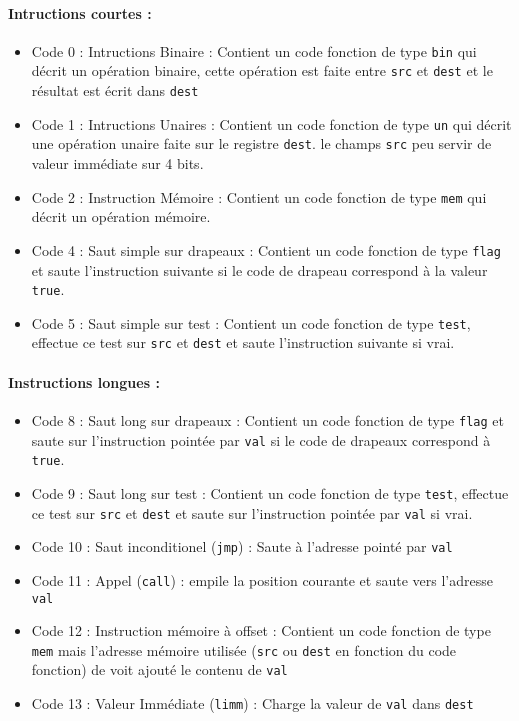 \documentclass[12pt]{article}
\begin{document}
\paragraph{Intructions courtes :}
\begin{itemize}
\item Code 0 : Intructions Binaire : Contient un code fonction de type
  \verb!bin! qui décrit un opération binaire, cette opération est faite entre
  \verb!src! et \verb!dest! et le résultat est écrit dans \verb!dest!
\item Code 1 : Intructions Unaires : Contient un code fonction de type \verb!un!
  qui décrit une opération unaire faite sur le registre \verb!dest!. le champs \verb!src!
  peu servir de valeur immédiate sur 4 bits.
\item Code 2 : Instruction Mémoire : Contient un code fonction de type
  \verb!mem! qui décrit un opération mémoire.
\item Code 4 : Saut simple sur drapeaux  : Contient un code fonction de type \verb!flag!
  et saute l'instruction suivante si le code de drapeau correspond à la valeur
  \verb!true!.
\item Code 5 : Saut simple sur test : Contient un code fonction de type
  \verb!test!, effectue ce test sur \verb!src! et \verb!dest! et saute
  l'instruction suivante si vrai.
\end{itemize}

\paragraph{Instructions longues :}
\begin{itemize}
\item Code 8 : Saut long sur drapeaux : Contient un code fonction de type \verb!flag!
  et saute sur l'instruction pointée par \verb!val! si le code de drapeaux
  correspond à \verb!true!.
\item Code 9 : Saut long sur test : Contient un code fonction de type
  \verb!test!, effectue ce test sur \verb!src! et \verb!dest! et saute
  sur l'instruction pointée par \verb!val! si vrai.
\item Code 10 : Saut inconditionel (\verb!jmp!) : Saute à l'adresse pointé par \verb!val!
\item Code 11 : Appel (\verb!call!) : empile la position courante et saute vers l'adresse
  \verb!val!
\item Code 12 : Instruction mémoire à offset : Contient un code fonction de type
  \verb!mem! mais l'adresse mémoire utilisée (\verb!src! ou \verb!dest! en
  fonction du code fonction) de voit ajouté le contenu de \verb!val!
\item Code 13 : Valeur Immédiate (\verb!limm!) : Charge la valeur de \verb!val! dans \verb!dest! 
\end{itemize}
\end{document}
